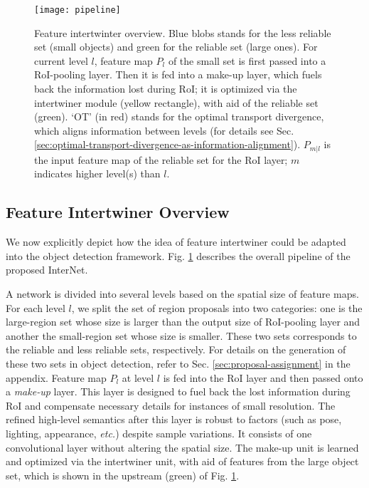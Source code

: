 \documentclass{article} \usepackage{iclr2019_conference,times}
\begin{document}
\begin{figure}[h]
\centering
		\texttt{[image: pipeline]}
		\caption{
			Feature intertwinter overview. 
			Blue blobs stands for the less reliable set (small objects) and green for the reliable set (large ones).
			For current level $l$, 
feature map $P_l$ of the small set is first passed into a RoI-pooling layer. Then it is fed into a make-up layer, which fuels back the information lost during RoI; it is optimized via the intertwiner module  (yellow rectangle), with aid of the reliable set (green). `OT' (in red) stands for the optimal transport divergence, which aligns information between levels (for details see Sec. \ref{sec:optimal-transport-divergence-as-information-alignment}).
			$P_{m | l}$ is the input feature map of the reliable set for the RoI layer; $m$ indicates higher level(s) than $l$.
		} \label{fig:overview}
\end{figure}

\subsection{Feature Intertwiner Overview}\label{sec:turbo-boost-module}

We now explicitly depict how the idea of feature intertwiner could be adapted into the object detection framework.
Fig. \ref{fig:overview} describes the overall pipeline of the proposed InterNet.


A network is divided into several levels based on the spatial size of feature maps. For each level $l$, 
we split the set of region proposals 
into two categories: one is the large-region set whose size is larger than the output size of RoI-pooling layer and another the small-region set whose size is smaller. These two sets corresponds to the reliable and less reliable sets, respectively. For details on the generation of these two sets in object detection, refer to Sec. \ref{sec:proposal-assignment} in the appendix.
Feature map $P_l$ at level $l$ is fed into the RoI layer and then passed onto a \textit{make-up} layer. This layer is designed to fuel back the lost information during RoI and compensate necessary details for instances of small resolution.
The refined high-level semantics after this layer is robust to factors (such as pose, lighting, appearance, \textit{etc.}) despite sample variations.
It consists of one convolutional layer without altering the spatial size. The make-up unit is learned and optimized via the intertwiner unit, with aid of features from the large object set, which is shown in the upstream (green) of Fig. \ref{fig:overview}.
\end{document}
